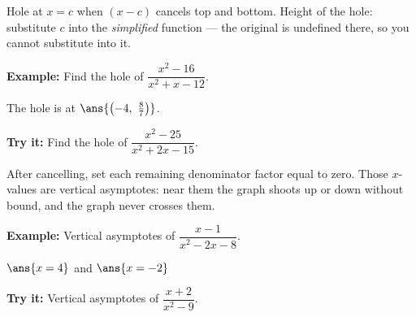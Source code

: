 \documentclass[12pt]{article}
\begin{document}


\begin{formulabox}
Hole at $x = c$ when $(x-c)$ cancels top and bottom. Height of the hole:
substitute $c$ into the \emph{simplified} function --- the original is
undefined there, so you cannot substitute into it.
\end{formulabox}

\begin{examplebox}
\textbf{Example:} \quad Find the hole of $\dfrac{x^2-16}{x^2+x-12}$.

The hole is at $\ans{\left(-4,\ \tfrac{8}{7}\right)}$.
\end{examplebox}

\begin{tryitbox}
\textbf{Try it:} \quad Find the hole of $\dfrac{x^2-25}{x^2+2x-15}$.\\[2pt]
\end{tryitbox}


\begin{formulabox}
After cancelling, set each remaining denominator factor equal to zero. Those
$x$-values are vertical asymptotes: near them the graph shoots up or down
without bound, and the graph never crosses them.
\end{formulabox}

\begin{examplebox}
\textbf{Example:} \quad Vertical asymptotes of $\dfrac{x-1}{x^2-2x-8}$.

$\ans{x = 4}$ \quad and \quad $\ans{x = -2}$
\end{examplebox}

\begin{tryitbox}
\textbf{Try it:} \quad Vertical asymptotes of $\dfrac{x+2}{x^2-9}$.\\[2pt]
\end{tryitbox}
\end{document}
